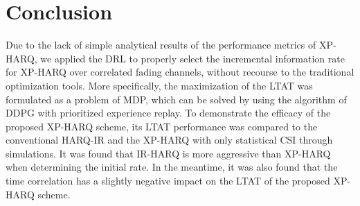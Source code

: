 \documentclass[lettersize,journal]{IEEEtran}
\begin{document}
\section{Conclusion}\label{sec:con}
Due to the lack of simple analytical results of the performance metrics of XP-HARQ, we applied the DRL to properly select the incremental information rate for XP-HARQ over correlated fading channels, without recourse to the traditional optimization tools. More specifically, the maximization of the LTAT was formulated as a problem of MDP, which can be solved by using the algorithm of DDPG with prioritized experience replay. To demonstrate the efficacy of the proposed XP-HARQ scheme, its LTAT performance was compared to the conventional HARQ-IR and the XP-HARQ with only statistical CSI through simulations. It was found that IR-HARQ is more aggressive than XP-HARQ when determining the initial rate. In the meantime, it was also found that the time correlation has a slightly negative impact on the LTAT of the proposed XP-HARQ scheme.




\end{document}
